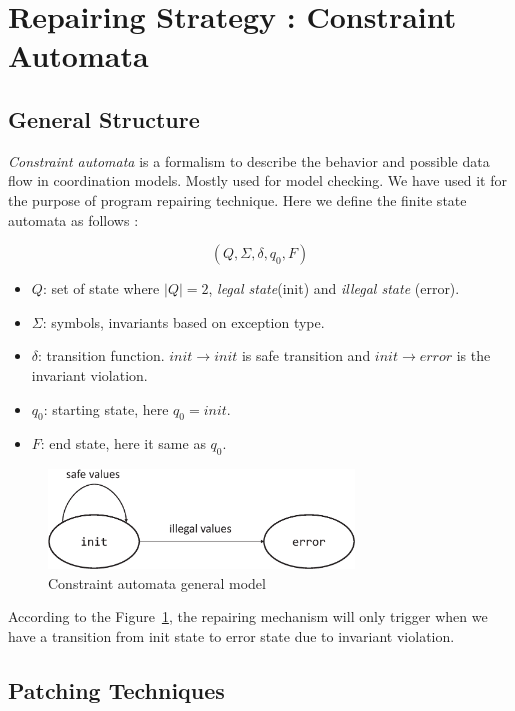 \section{Repairing Strategy : Constraint Automata}
\label{sec:strgCA}

\subsection{General Structure}
\label{subsec:generalCA}

\emph{Constraint automata} is a formalism to describe the behavior and possible
data flow in coordination models. 
Mostly used for model checking. We have used it for the purpose of program
repairing technique. Here we define the finite state automata as follows :

$$(Q, \Sigma, \delta, q_0, F)$$
\begin{itemize}
	\item $Q$: set of state where $|Q| = 2$, \emph{legal state}(init) and
\emph{illegal state} (error).
	\item $\Sigma$: symbols, invariants based on exception type.
	\item $\delta$: transition function. $init \rightarrow init$ is safe
transition and $init \rightarrow error$ is the invariant violation.
	\item $q_0$: starting state, here $q_0 = init$.
	\item $F$: end state, here it same as $q_0$.
\end{itemize}

\begin{figure}[t]
\centering
\includegraphics[width=3.2in]{images/automata.eps}
\caption{Constraint automata general model}
\label{fig:automata}
\end{figure}

According to the Figure~\ref{fig:automata}, the repairing mechanism will only
trigger when we have a transition from 
init state to error state due to invariant violation.

\subsection{Patching Techniques}
\label{subsec:patchCA}

